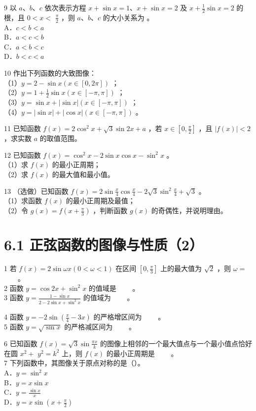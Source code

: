 \documentclass[10pt]{article}
\begin{document}
9 以 \(a 、 b 、 c\) 依次表示方程 \(x+\sin x=1 、 x+\sin x=2\) 及 \(x+\frac{1}{2} \sin x=2\) 的根，且 \(0<x<\) \(\frac{\pi}{2}\) ，则 \(a 、 b 、 c\) 的大小关系为 。\\
A．\(c<b<a\)\\
B．\(a<c<b\)\\
C．\(a<b<c\)\\
D．\(b<c<a\)

10 作出下列函数的大致图像：\\
（1）\(y=2-\sin x(x \in[0,2 \pi])\) ；\\
（2）\(y=1+\frac{1}{2} \sin x(x \in[-\pi, \pi])\) ；\\
（3）\(y=\sin x+|\sin x|(x \in[-\pi, \pi])\) ；\\
（4）\(y=|\sin x|+|\cos x|(x \in[-\pi, \pi])\) 。

11 已知函数 \(f(x)=2 \cos ^{2} x+\sqrt{3} \sin 2 x+a\) ，若 \(x \in\left[0, \frac{\pi}{2}\right]\) ，且 \(|f(x)|<2\) ，求实数 \(a\) 的取值范围。

12 已知函数 \(f(x)=\cos ^{2} x-2 \sin x \cos x-\sin ^{2} x\) 。\\
（1）求 \(f(x)\) 的最小正周期；\\
（2）求 \(f(x)\) 的最大值和最小值。

13 （选做）已知函数 \(f(x)=2 \sin \frac{x}{4} \cos \frac{x}{4}-2 \sqrt{3} \sin ^{2} \frac{x}{4}+\sqrt{3}\) 。\\
（1）求函数 \(f(x)\) 的最小正周期及最值；\\
（2）令 \(g(x)=f\left(x+\frac{\pi}{3}\right)\) ，判断函数 \(g(x)\) 的奇偶性，并说明理由。

\section*{6.1 正弦函数的图像与性质（2）}
1 若 \(f(x)=2 \sin \omega x(0<\omega<1)\) 在区间 \(\left[0, \frac{\pi}{3}\right]\) 上的最大值为 \(\sqrt{2}\) ，则 \(\omega=\) \(\qquad\)。\\
2 函数 \(y=\cos 2 x+\sin ^{2} x\) 的值域是 \(\qquad\)。\\
3 函数 \(y=\frac{1-\sin x}{2-2 \sin x+\sin ^{2} x}\) 的值域为 \(\qquad\)。

4 函数 \(y=-2 \sin \left(\frac{\pi}{4}-3 x\right)\) 的严格增区间为 \(\qquad\)。\\
5 函数 \(y=\sqrt{\sin x}\) 的严格减区间为 \(\qquad\)。

6 已知函数 \(f(x)=\sqrt{3} \sin \frac{\pi x}{k}\) 的图像上相邻的一个最大值点与一个最小值点恰好在圆 \(x^{2}+\) \(y^{2}=k^{2}\) 上，则 \(f(x)\) 的最小正周期是 \(\qquad\)。\\
7 下列函数中，其图像关于原点对称的是（）。\\
A．\(y=\sin ^{2} x\)\\
B．\(y=x \sin x\)\\
C．\(y=\frac{\sin x}{x}\)\\
D．\(y=x \sin \left(x+\frac{\pi}{2}\right)\)
\end{document}
